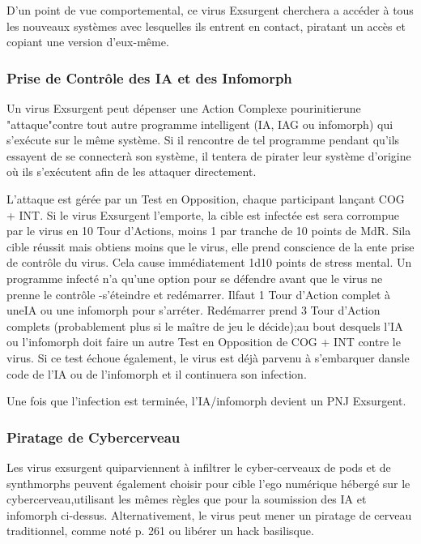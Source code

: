 D'un point de vue comportemental, ce virus Exsurgent cherchera a accéder à tous les nouveaux systèmes avec lesquelles ils entrent en contact, piratant un accès et copiant une version d'eux-même. 

\subsubsection{Prise de Contrôle des IA et des Infomorph} 

Un virus Exsurgent peut dépenser une Action Complexe pourinitierune "attaque"contre tout autre programme intelligent (IA, IAG ou infomorph) qui s'exécute sur le même système. Si il rencontre de tel programme pendant qu'ils essayent de se connecterà son système, il tentera de pirater leur système d'origine où ils s'exécutent afin de les attaquer directement. 

L'attaque est gérée par un Test en Opposition, chaque participant lançant COG + INT. Si le virus Exsurgent l'emporte, la cible est infectée est sera corrompue par le virus en 10 Tour d'Actions, moins 1 par tranche de 10 points de MdR. Sila cible réussit mais obtiens moins que le virus, elle prend conscience de la ente prise de contrôle du virus. Cela cause immédiatement 1d10 points de stress mental. Un programme infecté n'a qu'une option pour se défendre avant que le virus ne prenne le contrôle -s'éteindre et redémarrer. Ilfaut 1 Tour d'Action complet à uneIA ou une infomorph pour s'arréter. Redémarrer prend 3 Tour d'Action complets (probablement plus si le maître de jeu le décide);au bout desquels l'IA ou l'infomorph doit faire un autre Test en Opposition de COG + INT contre le virus. Si ce test échoue également, le virus est déjà parvenu à s'embarquer dansle code de l'IA ou de l'infomorph et il continuera son infection. 

Une fois que l'infection est terminée, l'IA/infomorph devient un PNJ Exsurgent. 

\subsubsection{Piratage de Cybercerveau} 

Les virus exsurgent quiparviennent à infiltrer le cyber-cerveaux de pods et de synthmorphs peuvent également choisir pour cible l'ego numérique hébergé sur le cybercerveau,utilisant les mêmes règles que pour la soumission des IA et infomorph ci-dessus. Alternativement, le virus peut mener un piratage de cerveau traditionnel, comme noté p. 261 ou libérer un hack basilisque. 

